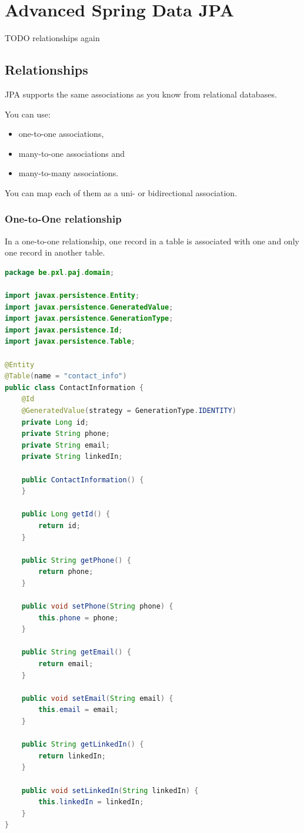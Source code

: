 \chapter{Advanced Spring Data JPA}


TODO relationships again

\section{Relationships}

JPA supports the same associations as you know from relational databases.

 You can use:
\begin{itemize}
\item one-to-one associations,
\item many-to-one associations and
\item many-to-many associations.
\end{itemize}
You can map each of them as a uni- or bidirectional association.


\subsection{One-to-One relationship}

In a one-to-one relationship, one record in a table is associated with one and only one record in another table.

\begin{lstlisting}[frame=single, language=java]
package be.pxl.paj.domain;

import javax.persistence.Entity;
import javax.persistence.GeneratedValue;
import javax.persistence.GenerationType;
import javax.persistence.Id;
import javax.persistence.Table;

@Entity
@Table(name = "contact_info")
public class ContactInformation {
	@Id
	@GeneratedValue(strategy = GenerationType.IDENTITY)
	private Long id;
	private String phone;
	private String email;
	private String linkedIn;

	public ContactInformation() {
	}

	public Long getId() {
		return id;
	}

	public String getPhone() {
		return phone;
	}

	public void setPhone(String phone) {
		this.phone = phone;
	}

	public String getEmail() {
		return email;
	}

	public void setEmail(String email) {
		this.email = email;
	}

	public String getLinkedIn() {
		return linkedIn;
	}

	public void setLinkedIn(String linkedIn) {
		this.linkedIn = linkedIn;
	}
}
\end{lstlisting}

